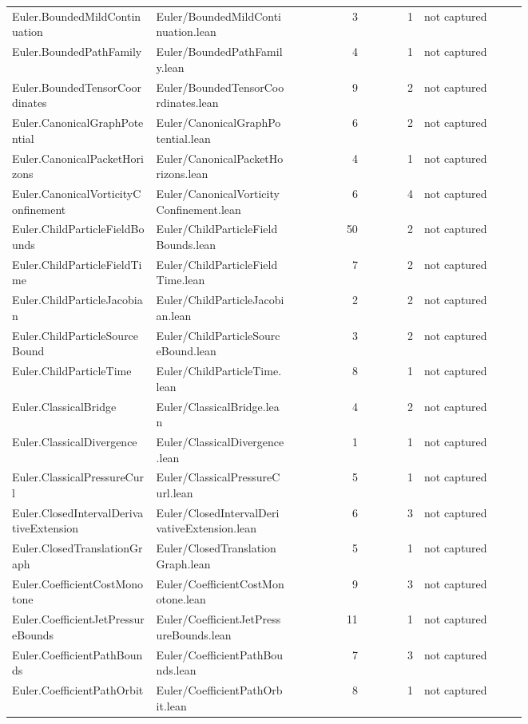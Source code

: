 \documentclass[10pt]{article}
\begin{document}
\begin{longtable}{p{0.28\linewidth}p{0.27\linewidth}r r p{0.20\linewidth}}
Euler.BoundedMildContinuation & Euler/BoundedMildContinuation.lean & 3 & 1 & not captured\\
Euler.BoundedPathFamily & Euler/BoundedPathFamily.lean & 4 & 1 & not captured\\
Euler.BoundedTensorCoordinates & Euler/BoundedTensorCoordinates.lean & 9 & 2 & not captured\\
Euler.CanonicalGraphPotential & Euler/CanonicalGraphPotential.lean & 6 & 2 & not captured\\
Euler.CanonicalPacketHorizons & Euler/CanonicalPacketHorizons.lean & 4 & 1 & not captured\\
Euler.CanonicalVorticityConfinement & Euler/CanonicalVorticityConfinement.lean & 6 & 4 & not captured\\
Euler.ChildParticleFieldBounds & Euler/ChildParticleFieldBounds.lean & 50 & 2 & not captured\\
Euler.ChildParticleFieldTime & Euler/ChildParticleFieldTime.lean & 7 & 2 & not captured\\
Euler.ChildParticleJacobian & Euler/ChildParticleJacobian.lean & 2 & 2 & not captured\\
Euler.ChildParticleSourceBound & Euler/ChildParticleSourceBound.lean & 3 & 2 & not captured\\
Euler.ChildParticleTime & Euler/ChildParticleTime.lean & 8 & 1 & not captured\\
Euler.ClassicalBridge & Euler/ClassicalBridge.lean & 4 & 2 & not captured\\
Euler.ClassicalDivergence & Euler/ClassicalDivergence.lean & 1 & 1 & not captured\\
Euler.ClassicalPressureCurl & Euler/ClassicalPressureCurl.lean & 5 & 1 & not captured\\
Euler.ClosedIntervalDerivativeExtension & Euler/ClosedIntervalDerivativeExtension.lean & 6 & 3 & not captured\\
Euler.ClosedTranslationGraph & Euler/ClosedTranslationGraph.lean & 5 & 1 & not captured\\
Euler.CoefficientCostMonotone & Euler/CoefficientCostMonotone.lean & 9 & 3 & not captured\\
Euler.CoefficientJetPressureBounds & Euler/CoefficientJetPressureBounds.lean & 11 & 1 & not captured\\
Euler.CoefficientPathBounds & Euler/CoefficientPathBounds.lean & 7 & 3 & not captured\\
Euler.CoefficientPathOrbit & Euler/CoefficientPathOrbit.lean & 8 & 1 & not captured\\

\end{longtable}
\end{document}
